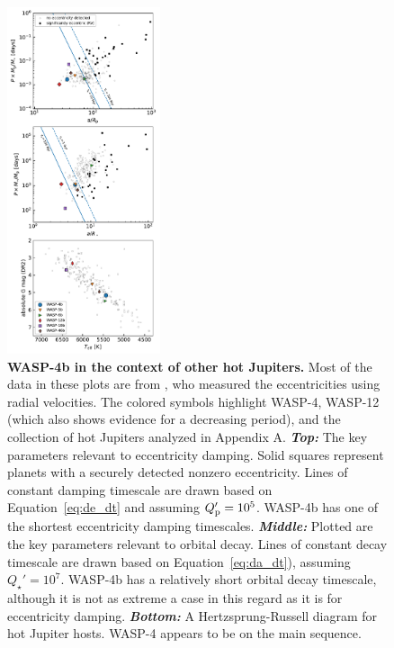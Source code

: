 \documentclass[12pt,twocolumn,tighten]{aastex62}
\begin{document}
\begin{figure}[!t]
  \begin{center}
    \includegraphics[width=0.40\textwidth]{f5.pdf}
  \end{center}
  \vspace{-0.5cm}
  \caption{
    {\bf WASP-4b in the context of other hot Jupiters.}
    Most of the data in these plots are from \citet{bonomo_gaps_2017},
    who measured the eccentricities using radial velocities.  The
    colored symbols highlight WASP-4, WASP-12 (which also shows
    evidence for a decreasing period), and the collection of hot
    Jupiters analyzed in Appendix A.
    {\bf \it Top:}
    The key parameters relevant to eccentricity damping.  Solid
    squares represent planets with a securely detected nonzero
    eccentricity. Lines of constant damping timescale are drawn based
    on Equation~\ref{eq:de_dt} and assuming $Q_{\rm p}' = 10^5$.
    WASP-4b has one of the shortest eccentricity damping timescales.
    {\bf \it Middle:} 
    Plotted are the key parameters relevant to orbital decay.  Lines
    of constant decay timescale are drawn based on
    Equation~\ref{eq:da_dt}), assuming $Q_\star' = 10^7$.  WASP-4b has
    a relatively short orbital decay timescale, although it is not as
    extreme a case in this regard as it is for eccentricity damping.
    {\bf \it Bottom:}
    A Hertzsprung-Russell diagram for hot Jupiter hosts. WASP-4
    appears to be on the main sequence.
    \label{fig:context}
  }
\end{figure}
\end{document}
